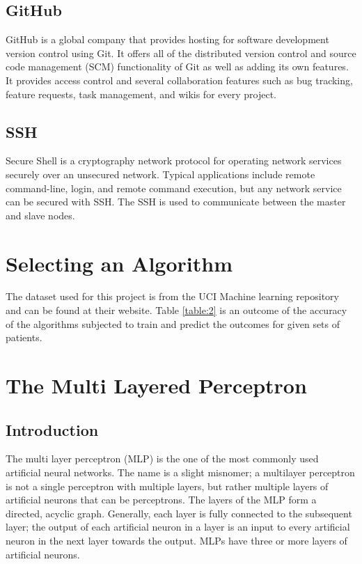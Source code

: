 \documentclass[12pt]{article}
\begin{document}
\subsection{GitHub}
GitHub is a global company that provides hosting for software development version control using Git. It offers all of the distributed version control and source code management (SCM) functionality of Git as well as adding its own features. It provides access control and several collaboration features such as bug tracking, feature requests, task management, and wikis for every project.

\subsection{SSH}
Secure Shell is a cryptography network protocol for operating network services securely over an unsecured network. Typical applications include remote command-line, login, and remote command execution, but any network service can be secured with SSH. The SSH is used to communicate between the master and slave nodes.

\newpage
\section{Selecting an Algorithm}
The dataset used for this project is from the UCI Machine learning repository and can be found at their website. Table \ref{table:2} is an outcome of the accuracy of the algorithms subjected to train and predict the outcomes for given sets of patients. 

\newpage
\section{The Multi Layered Perceptron}
\subsection{Introduction}
The multi layer perceptron (MLP) is the one of the most commonly used artificial neural networks. The name is a slight misnomer; a multilayer perceptron is not a single perceptron with multiple layers, but rather multiple layers of artificial neurons
that can be perceptrons. The layers of the MLP form a directed, acyclic graph. Generally, each layer is fully connected to the subsequent layer; the output of each artificial neuron in a layer is an input to every artificial neuron in the next layer
towards the output. MLPs have three or more layers of artificial neurons.
\end{document}
